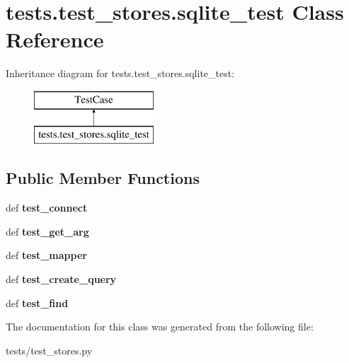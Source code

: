 \hypertarget{classtests_1_1test__stores_1_1sqlite__test}{\section{tests.\-test\-\_\-stores.\-sqlite\-\_\-test Class Reference}
\label{classtests_1_1test__stores_1_1sqlite__test}
}
Inheritance diagram for tests.\-test\-\_\-stores.\-sqlite\-\_\-test\-:\begin{figure}[H]
\begin{center}
\leavevmode
\includegraphics[height=2.000000cm]{classtests_1_1test__stores_1_1sqlite__test}
\end{center}
\end{figure}
\subsection*{Public Member Functions}
\begin{DoxyCompactItemize}
\item 
\hypertarget{classtests_1_1test__stores_1_1sqlite__test_ac7e870c7b3992aaebbe7b79c745da8fd}{def {\bfseries test\-\_\-connect}}\label{classtests_1_1test__stores_1_1sqlite__test_ac7e870c7b3992aaebbe7b79c745da8fd}

\item 
\hypertarget{classtests_1_1test__stores_1_1sqlite__test_a0643b991cd3c80085e432c5e13a06fe7}{def {\bfseries test\-\_\-get\-\_\-arg}}\label{classtests_1_1test__stores_1_1sqlite__test_a0643b991cd3c80085e432c5e13a06fe7}

\item 
\hypertarget{classtests_1_1test__stores_1_1sqlite__test_a0c3eab179470d84e633656fa43d0a47c}{def {\bfseries test\-\_\-mapper}}\label{classtests_1_1test__stores_1_1sqlite__test_a0c3eab179470d84e633656fa43d0a47c}

\item 
\hypertarget{classtests_1_1test__stores_1_1sqlite__test_a089d774289e05ab810966484c380907b}{def {\bfseries test\-\_\-create\-\_\-query}}\label{classtests_1_1test__stores_1_1sqlite__test_a089d774289e05ab810966484c380907b}

\item 
\hypertarget{classtests_1_1test__stores_1_1sqlite__test_aac0d74d6f632d1f9390f658e34c21974}{def {\bfseries test\-\_\-find}}\label{classtests_1_1test__stores_1_1sqlite__test_aac0d74d6f632d1f9390f658e34c21974}

\end{DoxyCompactItemize}


The documentation for this class was generated from the following file\-:\begin{DoxyCompactItemize}
\item 
tests/test\-\_\-stores.\-py\end{DoxyCompactItemize}
